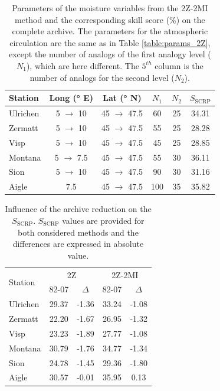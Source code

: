 \documentclass[hess, manuscript]{copernicus}
\begin{document}
\begin{table}[htb]
	\caption{Parameters of the moisture variables from the 2Z-2MI method and the corresponding skill score (\%) on the complete archive. The parameters for the atmospheric circulation are the same as in Table \ref{table:params_2Z}, except the number of analogs of the first analogy level ($N_{1}$), which are here different. The $5^{th}$ column is the number of analogs for the second level ($N_{2}$).}
	\begin{center}
		\begin{tabular}{l c c c c c }
			\hline
			Station & Long (° E) & Lat (° N) & $N_{1}$ & $N_{2}$ & $S_{\text{SCRP}}$ \\
			\hline
			Ulrichen & 5 $\rightarrow$ 10 & 45 $\rightarrow$ 47.5 & 60 & 25 & 34.31 \\
			Zermatt & 5 $\rightarrow$ 10 & 45 $\rightarrow$ 47.5 & 55 & 25 & 28.28 \\
			Visp & 5 $\rightarrow$ 10 & 45 $\rightarrow$ 47.5 & 45 & 25 & 28.85 \\
			Montana & 5 $\rightarrow$ 7.5 & 45 $\rightarrow$ 47.5 & 55 & 30 & 36.11 \\
			Sion & 5 $\rightarrow$ 10 & 45 $\rightarrow$ 47.5 & 90 & 30 & 31.16 \\
			Aigle & 7.5 & 45 $\rightarrow$ 47.5 & 100 & 35 & 35.82 \\ 
			\hline
		\end{tabular}
	\end{center}
	\label{table:params_2Z-2MI}
\end{table}

\begin{table}[htb]
	\caption{Influence of the archive reduction on the $S_{\text{SCRP}}$. $S_{\text{SCRP}}$ values are provided for both considered methods and the differences are expressed in absolute value.}
	\begin{center}
		\begin{tabular}{l c c c c }
			\hline
			\multirow{2}{*}{Station} & \multicolumn{2}{c}{2Z} & \multicolumn{2}{c}{2Z-2MI} \\
			& 82-07 & $\Delta$ & 82-07 & $\Delta$ \\ 
			\hline
			Ulrichen & 29.37 & -1.36 & 33.24 & -1.08 \\
			Zermatt & 22.20 & -1.67 & 26.95 & -1.32 \\
			Visp & 23.23 & -1.89 & 27.77 & -1.08 \\
			Montana & 30.79 & -1.76 & 34.77 & -1.34 \\
			Sion & 24.78 & -1.45 & 29.36 & -1.80 \\
			Aigle & 30.57 & -0.01 & 35.95 & 0.13 \\ 
			\hline
		\end{tabular}
	\end{center}
	\label{table:loss_reduction}
\end{table}
\end{document}
